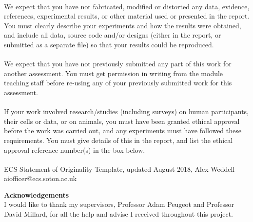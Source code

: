 \documentclass{article}
\begin{document}
\\[0.5cm]

We expect that you have not fabricated, modified or distorted any data, evidence, references,
experimental results, or other material used or presented in the report. You must clearly describe
your experiments and how the results were obtained, and include all data, source code and/or
designs (either in the report, or submitted as a separate file) so that your results could be
reproduced.\\

\\[0.5cm]

We expect that you have not previously submitted any part of this work for another assessment.
You must get permission in writing from the module teaching staff before re-using any of your
previously submitted work for this assessment.\\

\\[0.5cm]

If your work involved research/studies (including surveys) on human participants, their cells or
data, or on animals, you must have been granted ethical approval before the work was carried
out, and any experiments must have followed these requirements. You must give details of this in
the report, and list the ethical approval reference number(s) in the box below.\\

\\[0.5cm]


ECS Statement of Originality Template, updated August 2018, Alex Weddell aiofficer@ecs.soton.ac.uk\\


\newpage 

{\Huge \textbf{Acknowledgements}}\\[1cm]


I would like to thank my supervisors, Professor Adam Peugeot and Professor David Millard, for all the help and advise I received throughout this project. \\
\end{document}
